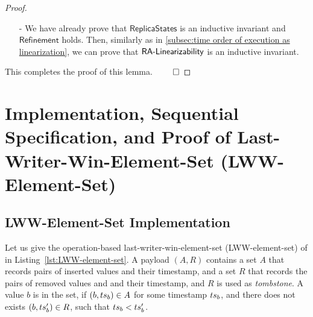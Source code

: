 \begin {proof}
\begin{itemize}
\begin{itemize}
    By the causal delivery assumption, if $\alabel$ is visible to an operation $\alabel'$, then the effector of $\alabel'$ has not been applied in $S'$ yet; if an operation $\alabel''$ is visible to $\alabel$, then the effector of $\alabel''$ has already been applied in $S'$. By Annotation1 of effector $(A_a,R_a)$, and Annotation2 of replica state $S$, we can see that $A_a \setminus \{ a \} \subseteq A$ and $R_a \subseteq R$, and thus, we can see that $A' = A \cup \{ a \}$ and $R' = R$. Therefore, we have that $S' = \abstate'$.

    \item[-] The cases of {\tt remove} can be similarly proved.

    \item[-] Applying the query $\alabelshort[read]{}$ on the replica state $S$ should result in the same return value as applying the same query in the context of the specification on the same state $\abstate = \refmap(S)$, which again holds trivially.
    \end{itemize}

\item[-] We have already prove that $\mathsf{ReplicaStates}$ is an inductive invariant and $\mathsf{Refinement}$ holds. Then, similarly as in \sectionautorefname \ref{subsec:time order of execution as linearization}, we can prove that $\mathsf{RA\text{-}Linearizability{}}$ is an inductive invariant.
\end{itemize}

This completes the proof of this lemma. $\qed$
\end {proof}






\section{Implementation, Sequential Specification, and Proof of Last-Writer-Win-Element-Set (LWW-Element-Set)}
\label{sec:implementation, sequential specification, and proof of last-writer-win-element-set (LWW-element-set)}


\subsection{LWW-Element-Set Implementation}
\label{subsec:LWW-element-set implementation}

Let us give the operation-based last-writer-win-element-set (LWW-element-set) of \cite{ShapiroPBZ11} in Listing~\ref{lst:LWW-element-set}. A payload $(A,R)$ contains a set $A$ that records pairs of inserted values and their timestamp, and a set $R$ that records the pairs of removed values and and their timestamp, and $R$ is used as \emph{tombstone}. A value $b$ is in the set, if $(b,ts_b) \in A$ for some timestamp $ts_b$, and there does not exists $(b,ts'_b) \in R$, such that $ts_b < ts'_b$.



